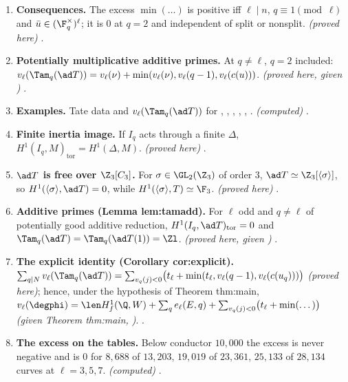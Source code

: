 \begin{enumerate}[label=\textbf{\thechapter.\arabic*}]
\[\]
\emph{(proved here, given )} .
\item \textbf{Consequences.} The excess $\min(\dots)$ is positive iff $\ell\mid n$, $q\equiv1\pmod\ell$ and $\bar u\in(\F_q^\times)^\ell$; it is $0$ at $q=2$ and independent of split or nonsplit. \emph{(proved
here)} .
\item \sloppy \textbf{Potentially multiplicative additive primes.} At $q\ne\ell$, $q=2$ included: $v_\ell(\Tam_q(\ad T))=v_\ell(\nu)+\min(v_\ell(\nu),v_\ell(q-1),v_\ell(c(u)))$. \emph{(proved here, given
)} .
\item \textbf{Examples.} Tate data and $v_\ell(\Tam_q(\ad T))$ for , , , , , . \emph{(computed)}
.
\item \textbf{Finite inertia image.} If $I_q$ acts through a finite $\Delta$, $H^1(I_q,M)_{\mathrm{tor}}=H^1(\Delta,M)$. \emph{(proved here)} .
\item \sloppy \textbf{$\ad T$ is free over $\Z_3[C_3]$.} For $\sigma\in\GL_2(\Z_3)$ of order $3$, $\ad T\simeq\Z_3[\langle\sigma\rangle]$, so $H^1(\langle\sigma\rangle,\ad T)=0$, while $H^1(\langle\sigma\rangle,T)\simeq\F_3$. \emph{(proved here)}
.
\item \textbf{Additive primes (Lemma lem:tamadd).} For $\ell$ odd and $q\ne\ell$ of potentially good additive reduction, $H^1(I_q,\ad T)_{\mathrm{tor}}=0$ and $\Tam_q(\ad T)=\Tam_q(\ad T(1))=\Zl$.
\emph{(proved here, given )} .
\item \sloppy \textbf{The explicit identity (Corollary cor:explicit).} $\sum_{q\mid N}v_\ell(\Tam_q(\ad T))=\sum_{v_q(j)<0}\bigl(t_\ell+\min(t_\ell,v_\ell(q-1),v_\ell(c(u_q)))\bigr)$ \emph{(proved here)}; hence, under the
hypothesis of Theorem thm:main, $v_\ell(\degphi)=\len H^1_f(\Q,W)+\sum_qe_\ell(E,q)+\sum_{v_q(j)<0}\bigl(t_\ell+\min(\dots)\bigr)$ \emph{(given Theorem thm:main, )}.
.
\item \textbf{The excess on the tables.} Below conductor $10{,}000$ the excess is never negative and is $0$ for $8{,}688$ of $13{,}203$, $19{,}019$ of $23{,}361$, $25{,}133$ of $28{,}134$ curves at
$\ell=3,5,7$. \emph{(computed)} .

\end{enumerate}
